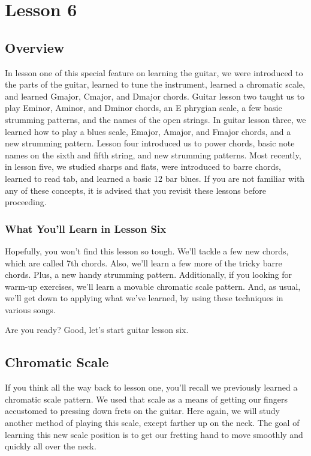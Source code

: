 \chapter{Lesson 6}
\section{Overview}
In lesson one of this special feature on learning the guitar, we were introduced to the parts of the guitar, learned to tune the instrument, learned a chromatic scale, and learned Gmajor, Cmajor, and Dmajor chords. Guitar lesson two taught us to play Eminor, Aminor, and Dminor chords, an E phrygian scale, a few basic strumming patterns, and the names of the open strings. In guitar lesson three, we learned how to play a blues scale, Emajor, Amajor, and Fmajor chords, and a new strumming pattern. Lesson four introduced us to power chords, basic note names on the sixth and fifth string, and new strumming patterns. Most recently, in lesson five, we studied sharps and flats, were introduced to barre chords, learned to read tab, and learned a basic 12 bar blues. If you are not familiar with any of these concepts, it is advised that you revisit these lessons before proceeding.

\subsection{What You'll Learn in Lesson Six}
Hopefully, you won't find this lesson so tough. We'll tackle a few new chords, which are called 7th chords. Also, we'll learn a few more of the tricky barre chords. Plus, a new handy strumming pattern. Additionally, if you looking for warm-up exercises, we'll learn a movable chromatic scale pattern. And, as usual, we'll get down to applying what we've learned, by using these techniques in various songs. 

Are you ready? Good, let's start guitar lesson six.

\section{Chromatic Scale}
If you think all the way back to lesson one, you'll recall we previously learned a chromatic scale pattern. We used that scale as a means of getting our fingers accustomed to pressing down frets on the guitar. Here again, we will study another method of playing this scale, except farther up on the neck. The goal of learning this new scale position is to get our fretting hand to move smoothly and quickly all over the neck.

